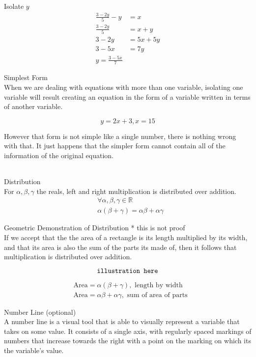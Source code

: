 \documentclass{book}
\begin{document}
  {\example Isolate $y$ \\
    \begin{align*}
      \frac{3 - 2y}{5} - y & = x\\
      \frac{3 - 2y}{5} & = x + y\\
      3 - 2y & = 5x + 5y\\
      3 - 5x & = 7y\\
      y = \frac{3 - 5x}{7}
    \end{align*}
  }

  {\remark Simplest Form \\
    When we are dealing with equations with more than one variable, isolating one variable will result creating an equation in the form of a variable written in terms of another variable.

    $$y = 2x + 3, x = 15$$

    However that form is not simple like a single number, there is nothing wrong with that. It just happens that the simpler form cannot contain all of the information of the original equation.
  }\\

  {\axiom Distribution \\
    For $\alpha, \beta, \gamma$ the reals, left and right multiplication is distributed over addition.
    \begin{align*}
      & \forall \alpha, \beta, \gamma \in \mathbb{R}\\
      & \alpha (\beta + \gamma) = \alpha \beta + \alpha \gamma
    \end{align*}
  }

  {\remark Geometric Demonstration of Distribution 
    * this is not proof\\
    If we accept that the the area of a rectangle is its length multiplied by its width, and that its area is also the sum of the parts its made of, then it follows that multiplication is distributed over addition.

    $$\text{\texttt{illustration here}}$$

    \begin{align*}
      & \text{Area} = \alpha (\beta + \gamma), \text{ length by width}\\
      & \text{Area} = \alpha \beta + \alpha \gamma, \text{ sum of area of parts}
    \end{align*}
  }

  {\remark Number Line (optional) \\
    A number line is a visual tool that is able to visually represent a variable that takes on some value. It consists of a single axis, with regularly spaced markings of numbers that increase towards the right with a point on the marking on which its the variable's value.
  }\\
\end{document}
